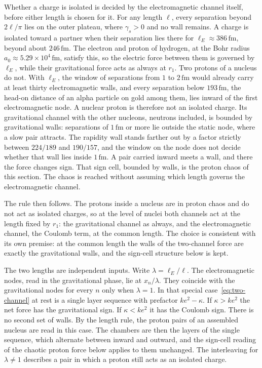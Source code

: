 \documentclass[a4paper]{article}
\begin{document}
Whether a charge is isolated is decided by the electromagnetic channel itself, before either length is chosen for it. For any length \(\ell\), every separation beyond \(2\ell/\pi\) lies on the outer plateau, where \(\gamma_s>0\) and no wall remains. A charge is isolated toward a partner when their separation lies there for \(\ell_E\approx 386\,\mathrm{fm}\), beyond about \(246\,\mathrm{fm}\). The electron and proton of hydrogen, at the Bohr radius \(a_0\approx 5.29\times 10^{4}\,\mathrm{fm}\), satisfy this, so the electric force between them is governed by \(\ell_E\), while their gravitational force acts as always at \(r_1\). Two protons of a nucleus do not. With \(\ell_E\), the window of separations from \(1\) to \(2\,\mathrm{fm}\) would already carry at least thirty electromagnetic walls, and every separation below \(193\,\mathrm{fm}\), the head-on distance of an alpha particle on gold among them, lies inward of the first electromagnetic node. A nuclear proton is therefore not an isolated charge. Its gravitational channel with the other nucleons, neutrons included, is bounded by gravitational walls: separations of \(1\,\mathrm{fm}\) or more lie outside the static node, where a slow pair attracts. The rapidity wall stands farther out by a factor strictly between \(224/189\) and \(190/157\), and the window on the node does not decide whether that wall lies inside \(1\,\mathrm{fm}\). A pair carried inward meets a wall, and there the force changes sign. That sign cell, bounded by walls, is the proton chaos of this section. The chaos is reached without assuming which length governs the electromagnetic channel.

The rule then follows. The protons inside a nucleus are in proton chaos and do not act as isolated charges, so at the level of nuclei both channels act at the length fixed by \(r_1\): the gravitational channel as always, and the electromagnetic channel, the Coulomb term, at the common length. The choice is consistent with its own premise: at the common length the walls of the two-channel force are exactly the gravitational walls, and the sign-cell structure below is kept.

The two lengths are independent inputs. Write \(\lambda=\ell_E/\ell\). The electromagnetic nodes, read in the gravitational phase, lie at \(x_n/\lambda\). They coincide with the gravitational nodes for every \(n\) only when \(\lambda=1\). In that special case~\eqref{eq:two-channel} at rest is a single layer sequence with prefactor \(k e^{2}-\kappa\). If \(\kappa>k e^{2}\) the net force has the gravitational sign. If \(\kappa<k e^{2}\) it has the Coulomb sign. There is no second set of walls. By the length rule, the proton pairs of an assembled nucleus are read in this case. The chambers are then the layers of the single sequence, which alternate between inward and outward, and the sign-cell reading of the chaotic proton force below applies to them unchanged. The interleaving for \(\lambda\neq 1\) describes a pair in which a proton still acts as an isolated charge.
\end{document}
